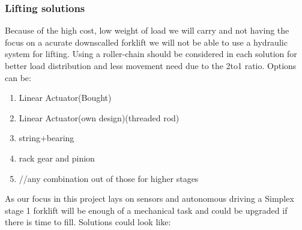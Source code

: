 \documentclass[../report.tex]{subfiles}
\begin{document}
\subsubsection{Lifting solutions}
Because of the high cost, low weight of load we will carry and not having the focus on a acurate downscalled 
forklift we will not be able to use a hydraulic system for lifting.
Using a roller-chain should be considered in each solution for better load distribution and less movement need due to the 2to1
ratio.
Options can be:
\begin{enumerate}
    \item Linear Actuator(Bought)
    \item Linear Actuator(own design)(threaded rod)
    \item string+bearing 
    \item rack gear and pinion
    \item //any combination out of those for higher stages
\end{enumerate}
As our focus in this project lays on sensors and autonomous driving a Simplex stage 1 forklift will be enough of a mechanical 
task and could be upgraded if there is time to fill. 
Solutions could look like:
\end{document}
